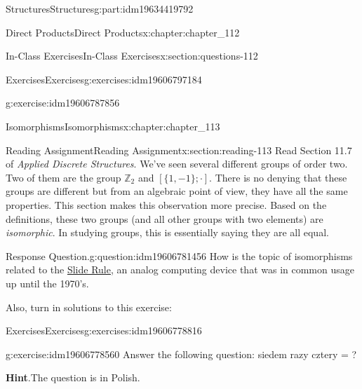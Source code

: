 \documentclass[oneside,10pt,]{book}
\newcommand{\blocktitlefont}{\relax}
\numberwithin{equation}{section}
\begin{document}
\begin{partptx}{Structures}{}{Structures}{}{}{g:part:idm19634419792}
\begin{chapterptx}{Direct Products}{}{Direct Products}{}{}{x:chapter:chapter_112}
\begin{sectionptx}{In-Class Exercises}{}{In-Class Exercises}{}{}{x:section:questions-112}
\begin{exercises-subsection-numberless}{Exercises}{}{Exercises}{}{}{g:exercises:idm19606797184}
\begin{exercisegroup}
\begin{divisionexerciseeg}{4}{}{}{g:exercise:idm19606787856}
\end{divisionexerciseeg}%
\end{exercisegroup}
\par\medskip\noindent
\end{exercises-subsection-numberless}
\end{sectionptx}
\end{chapterptx}
%
\typeout{************************************************}
\typeout{************************************************}
%
\begin{chapterptx}{Isomorphisms}{}{Isomorphisms}{}{}{x:chapter:chapter_113}
%
%
%
\typeout{************************************************}
\typeout{************************************************}
%
\begin{sectionptx}{Reading Assignment}{}{Reading Assignment}{}{}{x:section:reading-113}
Read Section 11.7  of \emph{Applied Discrete Structures}.  We've seen several different groups of order two. Two of them are the group \(\mathbb{Z}_2\) and \([\{1,-1\}; \cdot]\).  There is no denying that these groups are different but from an algebraic point of view, they have all the same properties.   This section makes this observation more precise.  Based on the definitions, these two groups (and all other groups with two elements) are \emph{isomorphic}.  In studying groups, this is essentially saying they are all equal.%
\begin{question}{Response Question.}{g:question:idm19606781456}%
How is the topic of isomorphisms related to the \hyperref[x:figure:fig-slide-rule]{Slide Rule}, an analog computing device that was in common usage up until the 1970's.%
\end{question}
Also, turn in solutions to this exercise:%
%
%
\typeout{************************************************}
\typeout{************************************************}
%
\begin{exercises-subsection-numberless}{Exercises}{}{Exercises}{}{}{g:exercises:idm19606778816}
\par\medskip\noindent%
%
\begin{exercisegroup}
\begin{divisionexerciseeg}{1}{}{}{g:exercise:idm19606778560}%
Answer the following question:  siedem razy cztery = \textunderscore{}\textunderscore{}\textunderscore{}\textunderscore{}\textunderscore{}?%
\par\smallskip%
\noindent\textbf{\blocktitlefont Hint}.\hypertarget{g:hint:idm19606778048}{}\quad{}The question is in Polish.%

\end{divisionexerciseeg}
\end{exercisegroup}
\end{exercises-subsection-numberless}
\end{sectionptx}
\end{chapterptx}
\end{partptx}
\end{document}

